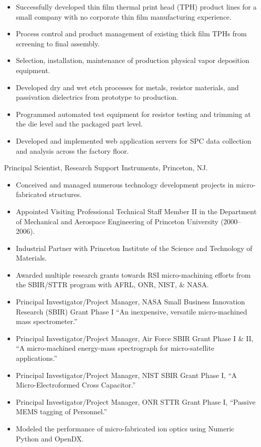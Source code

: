 \documentclass[american]{cv}
\begin{document}
\begin{topic}
\begin{itemize}
    \item Successfully developed thin film thermal print head (TPH) product lines for a small company with no corporate thin film manufacturing experience.
    \item Process control and product management of existing thick film TPHs from screening to final assembly.
    \item Selection, installation, maintenance of production physical vapor deposition equipment.
    \item Developed dry and wet etch processes for metals, resistor materials, and passivation dielectrics from prototype to production.
    \item Programmed automated test equipment for resistor testing and trimming at the die level and the packaged part level.
    \item Developed and implemented web application servers for SPC data collection and analysis across the factory floor.
\end{itemize}

\item [April~2000-July 2007]Principal Scientist, Research Support Instruments,
Princeton, NJ.

\begin{itemize}
    \item Conceived and managed numerous technology development projects in micro-fabricated structures.
    \item Appointed Visiting Professional Technical Staff Member II in the Department of Mechanical and Aerospace Engineering of Princeton University (2000--2006).
    \item Industrial Partner with Princeton Institute of the Science and Technology of Materials.
    \item Awarded multiple research grants towards RSI micro-machining efforts from the SBIR/STTR program with AFRL, ONR, NIST, \& NASA.
    \item Principal Investigator/Project Manager, NASA Small Business Innovation Research (SBIR) Grant Phase I ``An inexpensive, versatile micro-machined mass spectrometer.''
    \item Principal Investigator/Project Manager, Air Force SBIR Grant Phase I \& II, ``A micro-machined energy-mass spectrograph for micro-satellite applications.''
    \item Principal Investigator/Project Manager, NIST SBIR Grant Phase I, ``A Micro-Electroformed Cross Capacitor.''
    \item Principal Investigator/Project Manager, ONR STTR Grant Phase I, ``Passive MEMS tagging of Personnel.''
    \item Modeled the performance of micro-fabricated ion optics using Numeric Python and OpenDX.
\end{itemize}


\end{topic}
\end{document}
